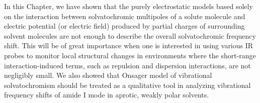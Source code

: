 \documentclass[a4paper,titlepage,twoside,fleqn,12pt]{book}
\begin{document}
\begin{refsection}
In this Chapter, we have shown that the purely electrostatic
models based solely on the interaction between
solvatochromic multipoles of a solute molecule and electric
potential (or electric field) produced by partial charges of
surrounding solvent molecules are not enough to describe the
overall solvatochromic frequency shift. This will be of great
importance when one is interested in using various IR probes
to monitor local structural changes in environments where the
short\hyp{}range interaction\hyp{}induced terms, such as repulsion and
dispersion interactions, are not negligibly small.
We also showed that Onsager model of vibrational solvatochromism
should be treated as a qualitative tool in analyzing vibrational
frequency shifts of amide I mode in aprotic, weakly polar solvents.

\printbibliography[heading=subbibintoc,title={References}]
\end{refsection}



\end{document}
